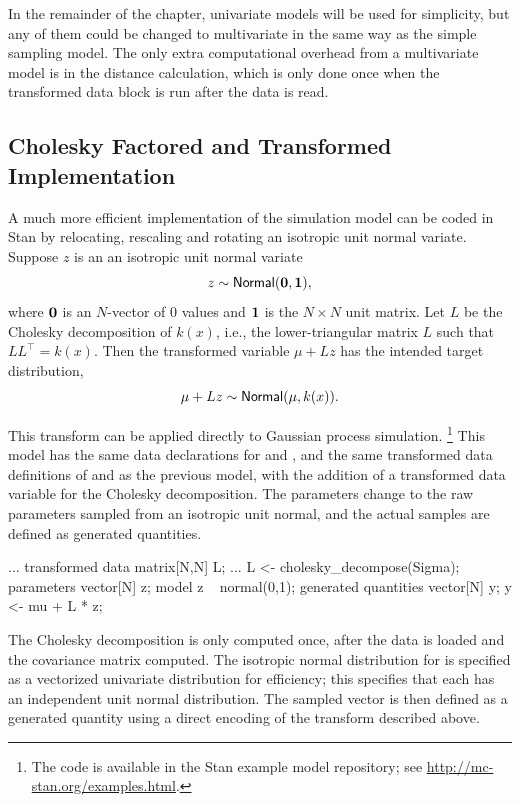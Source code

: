 In the remainder of the chapter, univariate models will be used for
simplicity, but any of them could be changed to multivariate in the
same way as the simple sampling model.  The only extra computational
overhead from a multivariate model is in the distance calculation,
which is only done once when the transformed data block is run after
the data is read.

\subsection{Cholesky Factored and Transformed Implementation}

A much more efficient implementation of the simulation model can be
coded in Stan by relocating, rescaling and rotating an isotropic unit
normal variate.  Suppose $z$ is an an isotropic unit normal variate
\[
z \sim \distro{Normal}({\bf 0}, {\bf 1}),
\]
where ${\bf 0}$ is an $N$-vector of 0 values and ${\bf 1}$ is the $N
\times N$ unit matrix.  Let $L$ be the Cholesky decomposition of
$k(x)$, i.e., the lower-triangular matrix $L$ such that $LL^{\top} =
k(x)$.  Then the transformed variable $\mu + Lz$ has the intended
target distribution,
\[
\mu + Lz \sim \distro{Normal}(\mu,k(x)).
\]

This transform can be applied directly to Gaussian process
simulation.%
%
\footnote{The code is available in the Stan example model repository;
see \url{http://mc-stan.org/examples.html}.}
%
This model has the same data declarations for  and ,
and the same transformed data definitions of  and
 as the previous model, with the addition of a transformed
data variable for the Cholesky decomposition.  The parameters change
to the raw parameters sampled from an isotropic unit normal, and the
actual samples are defined as generated quantities.
%
\begin{stancode}
...
transformed data {
  matrix[N,N] L;
...
  L <- cholesky_decompose(Sigma);
}
parameters {
  vector[N] z;
}
model {
  z ~ normal(0,1);
}
generated quantities {
  vector[N] y;
  y <- mu + L * z;
}
\end{stancode}
%
The Cholesky decomposition is only computed once, after the data is
loaded and the covariance matrix  computed.  The isotropic
normal distribution for  is specified as a vectorized
univariate distribution for efficiency; this specifies that each
 has an independent unit normal distribution.  The sampled
vector  is then defined as a generated quantity using a direct
encoding of the transform described above.


